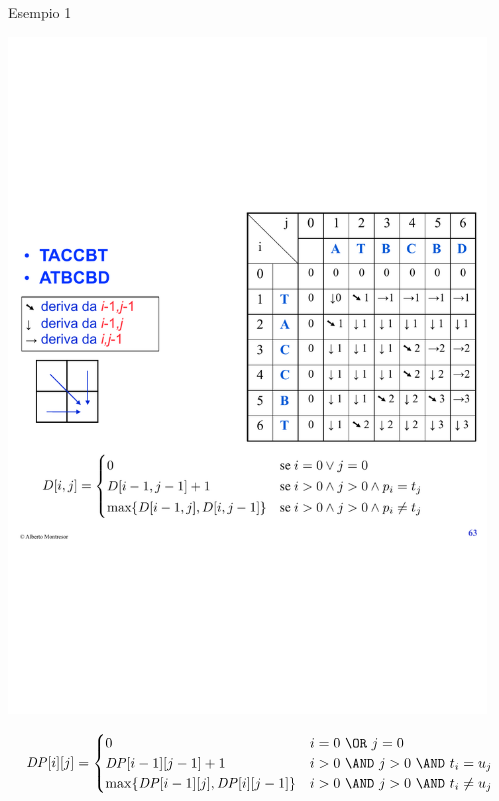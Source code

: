 \begin{frame}{Esempio 1}

\centering
\vspace{-9pt}
\includegraphics[width=0.95\textwidth,page=1]{lcs.pdf}

\tiny
\[
  \mathit{DP}[i][j] = \begin{cases}
   0 & i=0\ \OR\ j=0 \\
   \mathit{DP}[i-1][j-1]+1 & i>0\ \AND\ j>0\ \AND\ t_i = u_j \\
   \max \{ \mathit{DP}[i-1][j], \mathit{DP}[i][j-1] \} & i>0\ \AND\ j>0\ \AND\ t_i \neq u_j
  \end{cases}
\]

\end{frame}

